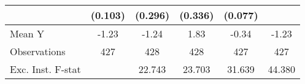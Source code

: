 {\begin{tabular}{l*{5}{c}}
            &     (0.103)         &     (0.296)         &     (0.336)         &     (0.077)         &                     \\
\midrule
Mean Y      &       -1.23         &       -1.24         &        1.83         &       -0.34         &       -1.23         \\
Observations&         427         &         428         &         428         &         427         &         427         \\
Exc. Inst. F-stat&                     &      22.743         &      23.703         &      31.639         &      44.380         \\
\bottomrule
\end{tabular}
}
